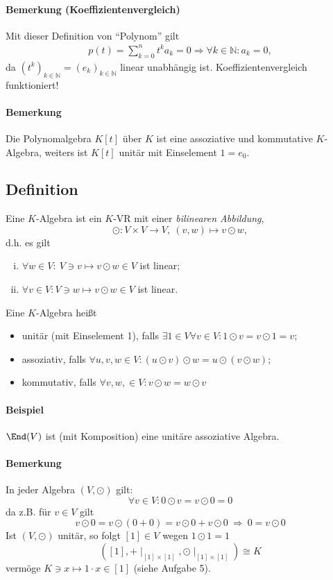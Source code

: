 \paragraph{Bemerkung (Koeffizientenvergleich)}
	Mit dieser Definition von "`Polynom"' gilt
		\begin{align*}
			p(t)=\sum_{k=0}^{n}t^ka_k = 0
			\Rightarrow \forall k\in \mathbb{N}: a_k = 0,
		\end{align*}
	da $ (t^k)_{k\in \mathbb{N}} = (e_k)_{k\in \mathbb{N}}$ linear unabhängig ist.
	Koeffizientenvergleich funktioniert!
\paragraph{Bemerkung}
	Die Polynomalgebra $ K[t] $ über $ K $ ist eine assoziative und kommutative $ K $-Algebra, weiters ist $ K[t] $ unitär mit Einselement $ 1=e_0 $.
\subsection{Definition}
	\begin{Definition}[Algebra]
		Eine $ K $-Algebra ist ein $ K $-VR mit einer \emph{bilinearen Abbildung},
		\[ \odot: V\times V \to V,\ (v,w)\mapsto v\odot w, \]
	d.h. es gilt
		\begin{enumerate}[(i)]
			\item $ \forall w\in V:\ V\ni v\mapsto v\odot w\in V $ ist linear;
			\item $ \forall v\in V: V\ni w\mapsto v\odot w\in V $ ist linear.
		\end{enumerate}
	
	Eine $ K $-Algebra heißt
		\begin{itemize}
			\item unitär (mit Einselement 1), falls  \hfill$ \exists 1\in V\forall v\in V: 1\odot v = v\odot 1 = v; $
			\item assoziativ, falls \hfill$ \forall u,v,w\in V: (u\odot v)\odot w = u\odot (v\odot w); $
			\item kommutativ, falls \hfill$ \forall v,w,\in V: v\odot w = w\odot v $
		\end{itemize}
	\end{Definition}
\paragraph{Beispiel}
	$ \End(V) $ ist (mit Komposition) eine unitäre assoziative Algebra.
\paragraph{Bemerkung}
	In jeder Algebra $ (V,\odot) $ gilt:
		\[ \forall v\in V: 0\odot v = v\odot 0 = 0 \]
	da z.B. für $ v\in V $ gilt
		\[ v\odot 0 = v\odot (0+0) = v\odot 0 + v\odot 0 \ \Rightarrow\  0=v\odot 0\]
	Ist $ (V,\odot) $ unitär, so folgt $ [1]\in V $ wegen $ 1\odot 1 = 1 $
		\[ ([1], +\mid_{[1]\times [1]},\odot\mid_{[1]\times [1]} ) \cong K \]
	vermöge $ K\ni x \mapsto 1 \cdot x\in [1] $ (siehe Aufgabe 5).
